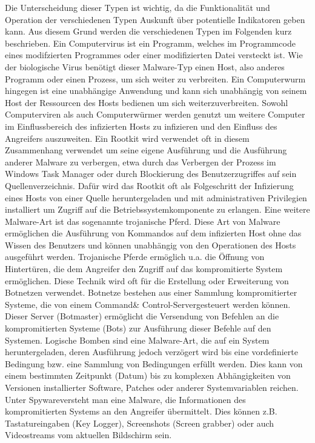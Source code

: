 Die Unterscheidung dieser Typen ist wichtig, da die Funktionalität und Operation der verschiedenen Typen Auskunft über potentielle Indikatoren geben kann. Aus diesem Grund werden die verschiedenen Typen im Folgenden kurz beschrieben. 
Ein Computervirus  ist ein Programm, welches im Programmcode eines modifzierten Programmes oder einer modifizierten Datei versteckt ist. Wie der biologische Virus benötigt dieser Malware-Typ einen Host, also anderes Programm oder einen Prozess, um sich weiter zu verbreiten. Ein Computerwurm hingegen ist eine unabhängige Anwendung und kann sich unabhängig von seinem Host der Ressourcen des Hosts bedienen um sich weiterzuverbreiten. Sowohl Computerviren als auch Computerwürmer werden genutzt um weitere Computer im Einflussbereich des infizierten Hosts zu infizieren und den Einfluss des Angreifers auszuweiten. 
Ein Rootkit wird verwendet oft in diesem Zusammenhang verwendet um seine eigene Ausführung und die Ausführung anderer Malware zu verbergen, etwa durch das Verbergen der Prozess im Windows Task Manager oder durch Blockierung des Benutzerzugriffes auf sein Quellenverzeichnis. Dafür wird das Rootkit oft als Folgeschritt der Infizierung eines Hosts von einer Quelle heruntergeladen und mit administrativen Privilegien installiert um Zugriff auf die Betriebssystemkomponente zu erlangen.
Eine weitere Malware-Art ist das sogenannte \glqq trojanische Pferd\grqq . Diese Art von Malware ermöglichen die Ausführung von Kommandos auf dem infizierten Host ohne das Wissen des Benutzers und können unabhängig von den Operationen des Hosts ausgeführt werden. Trojanische Pferde ermöglich u.a. die Öffnung von Hintertüren, die dem Angreifer den Zugriff auf das kompromitierte System ermöglichen. Diese Technik wird oft für die Erstellung oder Erweiterung von Botnetzen verwendet. Botnetze bestehen aus einer Sammlung kompromitierter Systeme, die von einem \glqq Command\& Control-Server\grqq  gesteuert werden können. Dieser Server (Botmaster) ermöglicht die Versendung von Befehlen an die kompromitierten Systeme (Bots) zur Ausführung dieser Befehle auf den Systemen.
Logische Bomben sind eine Malware-Art, die auf ein System heruntergeladen, deren Ausführung jedoch verzögert wird bis eine vordefinierte Bedingung bzw. eine Sammlung von Bedingungen erfüllt werden. Dies kann von einem bestimmten Zeitpunkt (Datum) bis zu komplexen Abhängigkeiten von Versionen installierter Software, Patches oder anderer Systemvariablen reichen.
Unter \glqq Spyware\grqq  versteht man eine Malware, die Informationen des kompromitierten Systems an den Angreifer übermittelt. Dies können z.B. Tastatureingaben (Key Logger), Screenshots (Screen grabber) oder  auch Videostreams vom aktuellen Bildschirm sein\citep{Campbell2016}.

